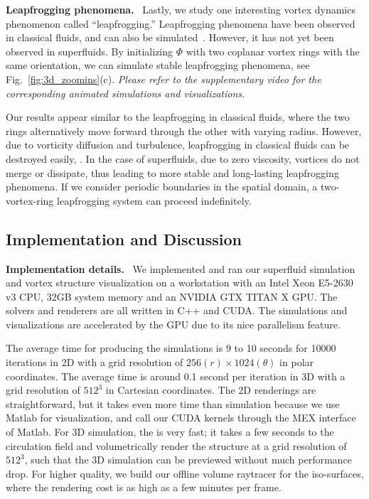 \documentclass[10pt,journal,compsoc,twoside]{IEEEtran}
\newcommand{\bl}[1]{{\color{black}{#1}}}
\begin{document}
	\vspace{0.15cm}
	\noindent
	\textbf{Leapfrogging phenomena.} \
	Lastly, we study one interesting vortex dynamics phenomenon called ``leapfrogging.''
	Leapfrogging phenomena have been observed in classical fluids, and can also be simulated~\cite{Riley_93}.
	However, it has not yet been observed in superfluids.
	By initializing $\Phi$ with two coplanar vortex rings with the same orientation, we can simulate stable leapfrogging phenomena, see Fig.~\ref{fig:3d_zoomins}(c).
	\textit{Please refer to the supplementary video for the corresponding animated simulations and visualizations.}
	
	Our results appear similar to the leapfrogging in classical fluids, where the two rings alternatively move forward through the other with varying radius.
	However, due to vorticity diffusion and turbulence, leapfrogging in classical fluids can be destroyed easily, \bl{and cannot last for a long time}.
	In the case of superfluids, due to zero viscosity, vortices do not merge or dissipate, thus leading to more stable and long-lasting leapfrogging phenomena.
	If we consider periodic boundaries in the spatial domain, a two-vortex-ring leapfrogging system can proceed indefinitely.

	
	
	\subsection{Implementation and Discussion}
	
	\noindent
	\textbf{Implementation details.} \
	We implemented and ran our superfluid simulation and vortex structure visualization on a workstation with an Intel Xeon E5-2630 v3 CPU, 32GB system memory and an NVIDIA GTX TITAN X GPU.
	The solvers and renderers are all written in C++ and CUDA. 
	The simulations and visualizations are accelerated by the GPU due to its nice parallelism feature.
	
	The average time for producing the simulations is 9 to 10 seconds for 10000 iterations in 2D with a grid resolution of $256 (r) \times 1024 (\theta)$ in polar coordinates. 
	The average time is around 0.1 second per iteration in 3D with a grid resolution of $512^3$ in Cartesian coordinates.
	The 2D renderings are straightforward, but it takes even more time than simulation because we use Matlab for visualization, and call our CUDA kernels through the MEX interface of Matlab. 
	For 3D simulation, the \bl{vortex identification} is very fast; it takes a few seconds to \bl{obtain} the circulation field and volumetrically render the structure at a grid resolution of $512^3$, such that the 3D simulation can be previewed without much performance drop. 
	For higher quality, we build our offline volume raytracer for the \bl{generated vortex tube} iso-surfaces, where the rendering cost is as high as a few minutes per frame.
	
\end{document}
